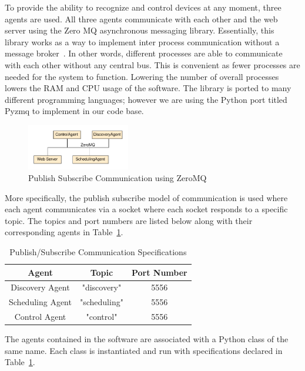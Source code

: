 \documentclass[conference]{IEEEtran}
\begin{document}
To provide the ability to recognize and control devices at any moment, three agents are used. All three agents communicate with each other and the web server using the Zero MQ asynchronous messaging library. Essentially, this library works as a way to implement inter process communication without a message
broker~\cite{zeromq}. In other words, different processes are able to communicate with each
other without any central bus. This is convenient as fewer processes are needed for the system to function. Lowering the number of overall processes lowers the
RAM and CPU usage of the software. The library is ported to many different programming languages; however we are using the Python port titled Pyzmq to
implement in our code base.
%
\begin{figure}[htbp]
    \centering
    \includegraphics[width=0.4\textwidth]{figs/agents/pubSubAgents.pdf}
    \caption{Publish Subscribe Communication using ZeroMQ}
    \label{fig:pubSubAgents}
\end{figure}

More specifically, the publish subscribe model of communication is used where
each agent communicates via a socket where each socket responds to a specific
topic. The topics and port numbers are listed below along with their
corresponding agents in Table~\ref{tab:pubsubspecs}. %
%
\begin{table}[htbp]
    \centering
    \begin{tabular}{|c|c|c|}
        \hline
        Agent & Topic & Port Number\\
        \hline
        Discovery Agent & "discovery" & 5556\\
        Scheduling Agent & "scheduling" & 5556\\
        Control Agent & "control" & 5556\\
        \hline
    \end{tabular}
    \caption{Publish/Subscribe Communication Specifications}
    \label{tab:pubsubspecs}
\end{table}
The agents contained in the software are associated with a Python class of the
same name. Each class is instantiated and run with specifications declared in
Table~\ref{tab:pubsubspecs}. 
\end{document}
